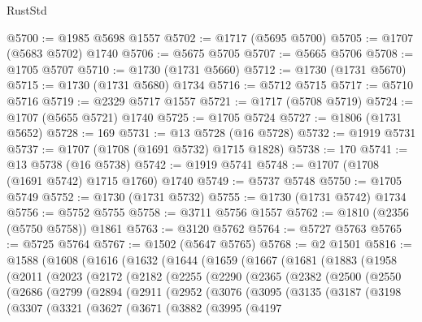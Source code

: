 \begin{lexlean}{RustStd}
\begin{coremodule}
@5700 := @1985 @5698 @1557
@5702 := @1717 (@5695 @5700)
@5705 := @1707 (@5683 @5702) @1740
@5706 := @5675 @5705
@5707 := @5665 @5706
@5708 := @1705 @5707
@5710 := @1730 (@1731 @5660)
@5712 := @1730 (@1731 @5670)
@5715 := @1730 (@1731 @5680) @1734
@5716 := @5712 @5715
@5717 := @5710 @5716
@5719 := @2329 @5717 @1557
@5721 := @1717 (@5708 @5719)
@5724 := @1707 (@5655 @5721) @1740
@5725 := @1705 @5724
@5727 := @1806 (@1731 @5652)
@5728 := 169
@5731 := @13 @5728 (@16 @5728)
@5732 := @1919 @5731
@5737 := @1707 (@1708 (@1691 @5732) @1715 @1828)
@5738 := 170
@5741 := @13 @5738 (@16 @5738)
@5742 := @1919 @5741
@5748 := @1707 (@1708 (@1691 @5742) @1715 @1760) @1740
@5749 := @5737 @5748
@5750 := @1705 @5749
@5752 := @1730 (@1731 @5732)
@5755 := @1730 (@1731 @5742) @1734
@5756 := @5752 @5755
@5758 := @3711 @5756 @1557
@5762 := @1810 (@2356 (@5750 @5758)) @1861
@5763 := @3120 @5762
@5764 := @5727 @5763
@5765 := @5725 @5764
@5767 := @1502 (@5647 @5765)
@5768 := @2 @1501
@5816 := @1588
    (@1608
      (@1616
        (@1632
          (@1644
            (@1659
              (@1667
                (@1681
                  (@1883
                    (@1958
                      (@2011
                        (@2023
                          (@2172
                            (@2182
                              (@2255
                                (@2290
                                  (@2365
                                    (@2382
                                      (@2500
                                        (@2550
                                          (@2686
                                            (@2799
                                              (@2894
                                                (@2911
                                                  (@2952
                                                    (@3076
                                                      (@3095
                                                        (@3135
                                                          (@3187
                                                            (@3198
                                                              (@3307
                                                                (@3321
                                                                  (@3627
                                                                    (@3671
                                                                      (@3882
                                                                        (@3995
                                                                          (@4197

\end{coremodule}
\end{lexlean}
